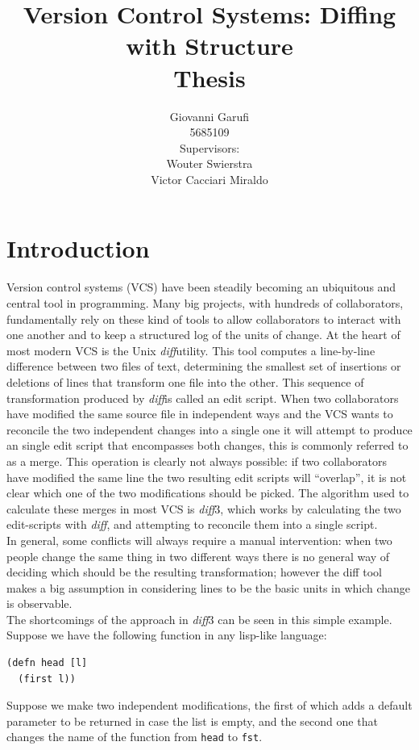 \documentclass[11pt, titlepage]{article}
\title{Version Control Systems: Diffing with Structure
\\ Thesis}
\author{Giovanni Garufi\\5685109\\[1cm]{Supervisors: \\
    Wouter Swierstra \\
    Victor Cacciari Miraldo}}
\affil{Department of Computing Science\\University of Utrecht}
\newcommand{\toClojure}[1]{\texttt{#1}\xspace}
\newcommand{\diff}{\emph{diff}}
\begin{document}
  


\maketitle
\tableofcontents


\section{Introduction}
Version control systems (VCS) have been steadily becoming an ubiquitous and central 
tool in programming. Many big projects, with hundreds of collaborators, 
fundamentally rely on these kind of tools to allow collaborators to interact 
with one another and to keep a structured log of the units of change. 
At the heart of most modern VCS is the Unix \diff utility. This tool computes a 
line-by-line difference between two files of text, determining the smallest set 
of insertions or deletions of lines that transform one file into the other. This sequence of transformation produced by \diff is called an edit script. 
When two collaborators have modified the same source file in independent ways and the VCS wants to reconcile the two independent changes into a single one it will attempt to produce an single edit script that encompasses both changes, this is commonly referred to 
as a merge. This operation is clearly not always possible: if two collaborators have modified the same line the two resulting edit scripts will ``overlap'', it is not clear which one of the two modifications should be picked.  The algorithm used to calculate these merges in most VCS is \diff3, which works by calculating the two edit-scripts with \diff, and attempting to reconcile them into a single script.
\\
In general, some conflicts will always require a manual intervention: when two 
people change the same thing in two different ways there is no general way of 
deciding which should be the resulting transformation; however the diff tool makes a big assumption in considering lines to be the basic units in which change is observable. 
\\
The shortcomings of the approach in \diff3 can be seen in this simple example.
Suppose we have the following function in any lisp-like language:

\begin{verbatim}
(defn head [l]
  (first l))
\end{verbatim}

Suppose we make two independent modifications, the first of which adds a default 
parameter to be returned in case the list is empty, and the second one that 
changes the name of the function from \toClojure{head} to \toClojure{fst}.
\end{document}
